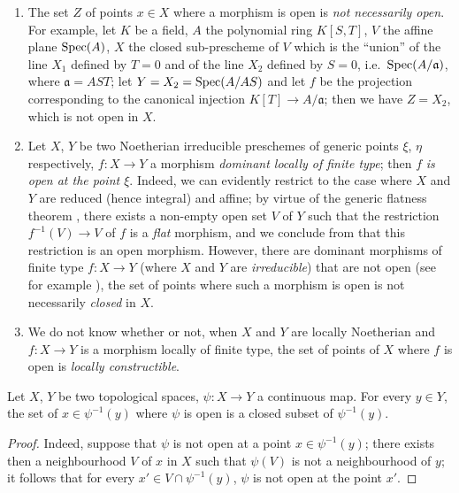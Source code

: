 \begin{remarks}[14.1.3]
\label{IV.14.1.3}
\begin{enumerate}[label=(\roman*)]
  \item The set $Z$ of points $x\in X$ where a morphism is open is \emph{not necessarily open}.
  For example, let $K$ be a field, $A$ the polynomial ring $K[S,T]$, $V$ the affine plane $\operatorname{Spec}(A)$, $X$ the closed sub-prescheme of $V$ which is the ``union'' of the line $X_1$ defined by $T=0$ and of the line $X_2$ defined by $S=0$, i.e.\ $\operatorname{Spec}(A/\mathfrak{a})$, where $\mathfrak{a}=AST$; let $Y=X_2=\operatorname{Spec}(A/AS)$ and let $f$ be the projection corresponding to the canonical injection $K[T]\to A/\mathfrak{a}$; then we have $Z=X_2$, which is not open in $X$.

  \item Let $X$, $Y$ be two Noetherian irreducible preschemes of generic points $\xi$, $\eta$ respectively, $f:X\to Y$ a morphism \emph{dominant locally of finite type}; then $f$ \emph{is open at the point $\xi$}.
  Indeed, we can evidently restrict to the case where $X$ and $Y$ are reduced (hence integral)  and affine; by virtue of the generic flatness theorem , there exists a non-empty open set $V$ of $Y$ such that the restriction $f^{-1}(V)\to V$ of $f$ is a \emph{flat} morphism, and we conclude from  that this restriction is an open morphism.
  However, there are dominant morphisms of finite type $f:X\to Y$ (where $X$ and $Y$ are \emph{irreducible}) that are not open (see for example ), the set of points where such a morphism is open is not necessarily \emph{closed} in $X$.

  \item We do not know whether or not, when $X$ and $Y$ are locally Noetherian and $f:X\to Y$ is a morphism locally of finite type, the set of points of $X$ where $f$ is open is \emph{locally constructible}.
\end{enumerate}
\end{remarks}

\begin{proposition}[14.1.4]
\label{IV.14.1.4}
Let $X$, $Y$ be two topological spaces, $\psi:X\to Y$ a continuous map.
For every $y\in Y$, the set of $x\in\psi^{-1}(y)$ where $\psi$ is open is a closed subset of $\psi^{-1}(y)$.
\end{proposition}

\begin{proof}
Indeed, suppose that $\psi$ is not open at a point $x\in\psi^{-1}(y)$; there exists then a neighbourhood $V$ of $x$ in $X$ such that $\psi(V)$ is not a neighbourhood of $y$; it follows that for every $x'\in V\cap\psi^{-1}(y)$, $\psi$ is not open at the point $x'$.
\end{proof}

